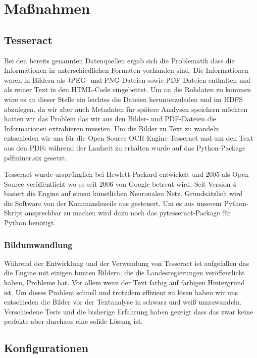 \documentclass[12pt,oneside,a4paper,parskip]{scrbook}
\begin{document}
\pagebreak

\section{Maßnahmen}

\subsection{Tesseract}

Bei den bereits genannten Datenquellen ergab sich die Problematik dass die Informationen in unterschiedlichen Formaten vorhanden sind. Die Informationen waren in Bildern als JPEG- und PNG-Dateien sowie PDF-Dateien enthalten und als reiner Text in den HTML-Code eingebettet. Um an die Rohdaten zu kommen wäre es an dieser Stelle ein leichtes die Dateien herunterzuladen und im HDFS abzulegen, da wir aber auch Metadaten für spätere Analysen speichern möchten hatten wir das Problem das wir aus den Bilder- und PDF-Dateien die Informationen extrahieren mussten. Um die Bilder zu Text zu wandeln entschieden wir uns für die Open Source OCR Engine Tesseract und um den Text aus den PDFs während der Laufzeit zu erhalten wurde auf das Python-Package pdfminer.six gesetzt.

Tesseract wurde ursprünglich bei Hewlett-Packard entwickelt und 2005 als Open Source veröffentlicht wo es seit 2006 von Google betreut wird.
Seit Version 4 basiert die Engine auf einem künstlichen Neuronalen Netz. Grundsätzlich wird die Software von der Kommandozeile aus gesteuert. Um es aus unserem Python-Skript ansprechbar zu machen wird dazu noch das pytesseract-Package für Python benötigt.

\subsubsection{Bildumwandlung}\label{sec:sub:sub:bild}
Während der Entwicklung und der Verwendung von Tesseract ist aufgefallen das die Engine mit einigen bunten Bildern, die die Landesregierungen veröffentlicht haben, Probleme hat. Vor allem wenn der Text farbig auf farbigen Hintergrund ist. Um dieses Problem schnell und trotzdem effizient zu lösen haben wir uns entschieden die Bilder vor der Textanalyse in schwarz und weiß umzuwandeln. Verschiedene Tests und die bisherige Erfahrung haben gezeigt dass das zwar keine perfekte aber durchaus eine solide Lösung ist.

\subsection{Konfigurationen}
\end{document}
